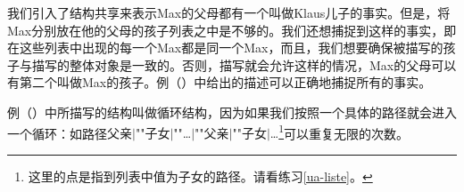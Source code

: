 我们引入了结构共享来表示Max的父母都有一个叫做Klaus儿子的事实。但是，将Max分别放在他的父母的孩子列表之中是不够的。我们还想捕捉到这样的事实，即在这些列表中出现的每一个Max都是同一个Max，而且，我们想要确保被描写的孩子与描写的整体对象是一致的。否则，描写就会允许这样的情况，Max的父母可以有第二个叫做Max的孩子。例（）中给出的描述可以正确地捕捉所有的事实。
\begin{figure}
\ea
\label{bsp-avm-zyklen}
 
\z
\vspace{-\baselineskip}\end{figure}%
例（）中所描写的结构叫做循环结构，因为如果我们按照一个具体的路径就会进入一个循环：如路径\textsc{父亲$|$""子女$|$""\ldots$|$""父亲$|$""子女$|$\ldots}\footnote{%
这里的点是指到列表中值为\textsc{子女}的路径。请看练习\ref{ua-liste}。
}可以重复无限的次数。

